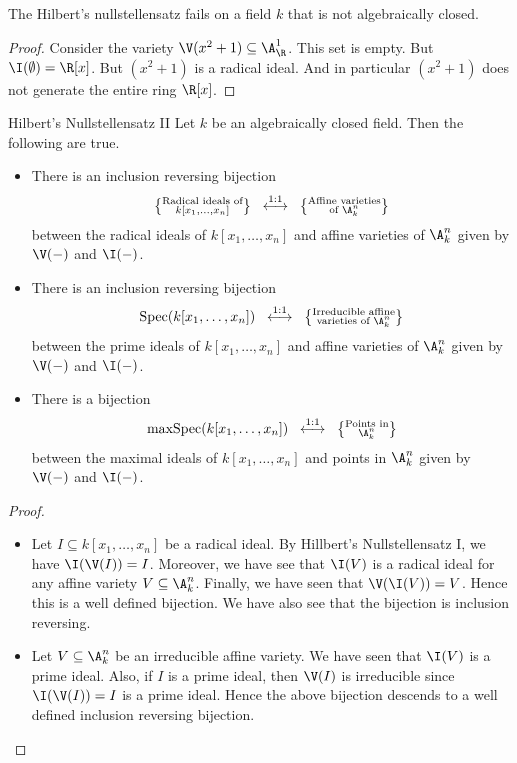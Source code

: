 \documentclass[a4paper]{article}
\begin{document}
\begin{eg}{}{} The Hilbert's nullstellensatz fails on a field $k$ that is not algebraically closed. \tcbline
\begin{proof}
Consider the variety $\V(x^2+1)\subseteq\A_\R^1$. This set is empty. But $\I(\emptyset)=\R[x]$. But $(x^2+1)$ is a radical ideal. And in particular $(x^2+1)$ does not generate the entire ring $\R[x]$. 
\end{proof}
\end{eg}

\begin{thm}{Hilbert's Nullstellensatz II}{} Let $k$ be an algebraically closed field. Then the following are true. 
\begin{itemize}
\item There is an inclusion reversing bijection $$\left\{\substack{\text{Radical ideals of}\\ k[x_1,\dots,x_n]}\right\}\;\;\overset{\text{1:1}}{\longleftrightarrow}\;\;\left\{\substack{\text{Affine varieties}\\\text{of }\A_k^n}\right\}$$ between the radical ideals of $k[x_1,\dots,x_n]$ and affine varieties of $\A_k^n$ given by $\V(-)$ and $\I(-)$. 
\item There is an inclusion reversing bijection $$\text{Spec}(k[x_1,\dots,x_n])\;\;\overset{\text{1:1}}{\longleftrightarrow}\;\;\left\{\substack{\text{Irreducible affine}\\\text{varieties of }\A_k^n}\right\}$$ between the prime ideals of $k[x_1,\dots,x_n]$ and affine varieties of $\A_k^n$ given by $\V(-)$ and $\I(-)$. 
\item There is a bijection $$\text{maxSpec}(k[x_1,\dots,x_n])\;\;\overset{\text{1:1}}{\longleftrightarrow}\;\;\left\{\substack{\text{Points in}\\\A_k^n}\right\}$$ between the maximal ideals of $k[x_1,\dots,x_n]$ and points in $\A_k^n$ given by $\V(-)$ and $\I(-)$. 
\end{itemize} \tcbline
\begin{proof}~\\
\begin{itemize}
\item Let $I\subseteq k[x_1,\dots,x_n]$ be a radical ideal. By Hillbert's Nullstellensatz I, we have $\I(\V(I))=I$. Moreover, we have see that $\I(V)$ is a radical ideal for any affine variety $V\subseteq\A_k^n$. Finally, we have seen that $\V(\I(V))=V$. Hence this is a well defined bijection. We have also see that the bijection is inclusion reversing. 
\item Let $V\subseteq\A_k^n$ be an irreducible affine variety. We have seen that $\I(V)$ is a prime ideal. Also, if $I$ is a prime ideal, then $\V(I)$ is irreducible since $\I(\V(I))=I$ is a prime ideal. Hence the above bijection descends to a well defined inclusion reversing bijection. 

\end{itemize}
\end{proof}
\end{thm}
\end{document}
